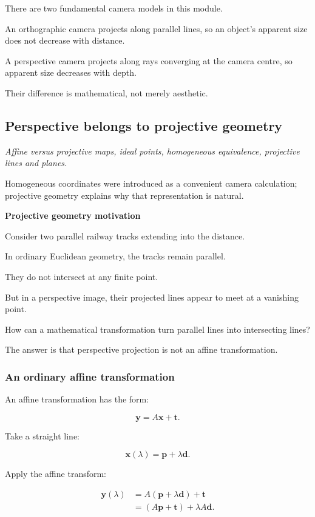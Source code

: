 There are two fundamental camera models in this module.

An orthographic camera projects along parallel lines, so an object's apparent size does not decrease with distance.

A perspective camera projects along rays converging at the camera centre, so apparent size decreases with depth.

Their difference is mathematical, not merely aesthetic.

\subsection{Perspective belongs to projective geometry}\label{perspective-belongs-to-projective-geometry}

\emph{Affine versus projective maps, ideal points, homogeneous equivalence, projective lines and planes.}

Homogeneous coordinates were introduced as a convenient camera calculation; projective geometry explains why that representation is natural.

\textbf{Projective geometry motivation}

Consider two parallel railway tracks extending into the distance.

In ordinary Euclidean geometry, the tracks remain parallel.

They do not intersect at any finite point.

But in a perspective image, their projected lines appear to meet at a vanishing point.

How can a mathematical transformation turn parallel lines into intersecting lines?

The answer is that perspective projection is not an affine transformation.

\subsubsection{An ordinary affine transformation}\label{an-ordinary-affine-transformation}

An affine transformation has the form:

\[
 \boxed{ \mathbf y=A\mathbf x+\mathbf t }.
\]

Take a straight line:

\[
 \mathbf x(\lambda)=\mathbf p+\lambda\mathbf d.
\]

Apply the affine transform:

\[
 \begin{aligned} \mathbf y(\lambda) &= A(\mathbf p+\lambda\mathbf d)+\mathbf t\\ &= (A\mathbf p+\mathbf t)+\lambda A\mathbf d. \end{aligned}
\]

